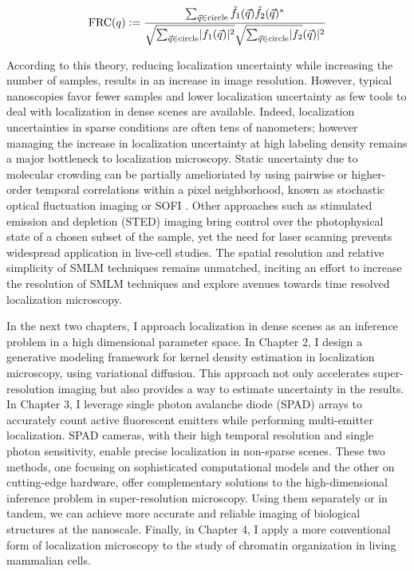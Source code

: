 \begin{equation*}
\mathrm{FRC}(q) \vcentcolon = \frac{\sum_{\vec{q}\in\mathrm{circle}}\tilde{f_{1}}(\vec{q})\tilde{f_{2}}(\vec{q})^{*}}{\sqrt{\sum_{\vec{q}\in\mathrm{circle}}\lvert f_{1}(\vec{q})\lvert^{2}}\sqrt{\sum_{\vec{q}\in\mathrm{circle}}\lvert f_{2}}(\vec{q})\lvert^{2}}
\end{equation*}

According to this theory, reducing localization uncertainty while increasing the number of samples, results in an increase in image resolution. However, typical nanoscopies favor fewer samples and lower localization uncertainty as few tools to deal with localization in dense scenes are available. Indeed, localization uncertainties in sparse conditions are often tens of nanometers; however managing the increase in localization uncertainty at high labeling density remains a major bottleneck to localization microscopy. Static uncertainty due to molecular crowding can be partially amelioriated by using pairwise or higher-order temporal correlations within a pixel neighborhood, known as stochastic optical fluctuation imaging or SOFI \parencite{Dertinger2009}. Other approaches such as stimulated emission and depletion (STED) imaging bring control over the photophysical state of a chosen subset of the sample, yet the need for laser scanning prevents widespread application in live-cell studies. The spatial resolution and relative simplicity of SMLM techniques remains unmatched, inciting an effort to increase the resolution of SMLM techniques and explore avenues towards time resolved localization microscopy.

In the next two chapters, I approach localization in dense scenes as an inference problem in a high dimensional parameter space. In Chapter 2, I design a generative modeling framework for kernel density estimation in localization microscopy, using variational diffusion. This approach not only accelerates super-resolution imaging but also provides a way to estimate uncertainty in the results. In Chapter 3,  I leverage single photon avalanche diode (SPAD) arrays to accurately count active fluorescent emitters while performing multi-emitter localization. SPAD cameras, with their high temporal resolution and single photon sensitivity, enable precise localization in non-sparse scenes. These two methods, one focusing on sophisticated computational models and the other on cutting-edge hardware, offer complementary solutions to the high-dimensional inference problem in super-resolution microscopy. Using them separately or in tandem, we can achieve more accurate and reliable imaging of biological structures at the nanoscale. Finally, in Chapter 4, I apply a more conventional form of localization microscopy to the study of chromatin organization in living mammalian cells. 

